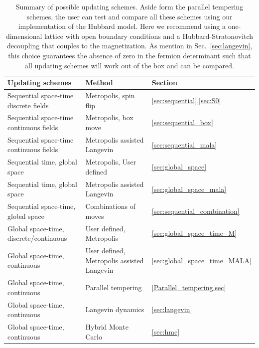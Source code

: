 \begin{table}[h]
	\begin{tabular}{@{} p{}  p{}  p{}  @{}}
		\toprule
		Updating schemes                          &  Method & Section \\
		\midrule
		Sequential space-time discrete fields   &      Metropolis, spin flip   & \ref{sec:sequential},\ref{sec:S0}  \\
		Sequential space-time continuous fields &      Metropolis, box move   & \ref{sec:sequential_box} \\
		Sequential space-time continuous fields &      Metropolis assisted Langevin   & \ref{sec:sequential_mala} \\
		Sequential time, global space           &      Metropolis, User defined            & \ref{sec:global_space} \\
		Sequential time, global space           &      Metropolis assisted Langevin   & \ref{sec:global_space_mala} \\
		Sequential space-time, global space     &      Combinations of moves          & \ref{sec:sequential_combination} \\
		Global space-time, discrete/continuous &      User defined, Metropolis            & \ref{sec:global_space_time_M} \\
		Global space-time, continuous          &      User defined, Metropolis assisted Langevin            & \ref{sec:global_space_time_MALA} \\
		Global space-time, continuous          &      Parallel tempering         & \ref{Parallel_tempering.sec} \\
		Global space-time, continuous          &      Langevin dynamics         & \ref{sec:langevin} \\
		Global space-time, continuous          &      Hybrid Monte Carlo                & \ref{sec:hmc} \\
		\bottomrule
	\end{tabular}
	\caption{Summary of possible updating schemes. Aside form the parallel tempering schemes, the user can test and compare all these schemes using  our implementation of the Hubbard model. Here we 
	recommend using a one-dimensional lattice with open boundary conditions and a Hubbard-Stratonovitch  decoupling that  couples to the magnetization. As mention in Sec.~\ref{sec:langevin}, this choice 
	guarantees the absence of zero in the fermion determinant such that all  updating schemes will work out of the box and can be compared. }
	\label{table:Updating_schemes}
\end{table}

